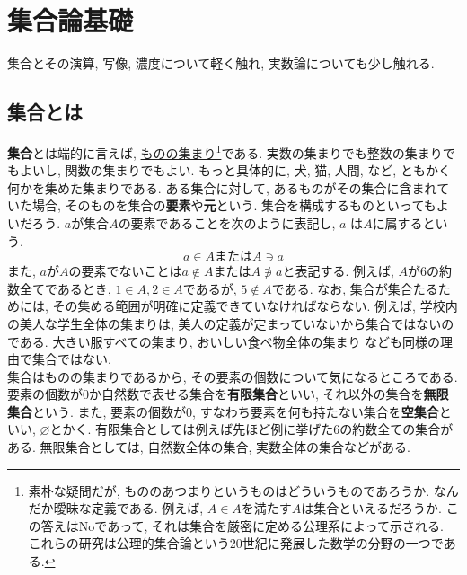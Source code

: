 \section{集合論基礎}
    集合とその演算, 写像, 濃度について軽く触れ, 実数論についても少し触れる.
    \subsection{集合とは}
        \textbf{集合}とは端的に言えば, \underline{ものの集まり}\footnote{素朴な疑問だが, もののあつまりというものはどういうものであろうか. なんだか曖昧な定義である. 例えば, $A\in A$を満たす$A$は集合といえるだろうか.
            この答えはNoであって, それは集合を厳密に定める公理系によって示される. これらの研究は公理的集合論という20世紀に発展した数学の分野の一つである.}である. 実数の集まりでも整数の集まりでもよいし, 関数の集まりでもよい.
        もっと具体的に, 犬, 猫, 人間, など, ともかく何かを集めた集まりである. ある集合に対して, あるものがその集合に含まれていた場合, 
        そのものを集合の\textbf{要素}や\textbf{元}という. 集合を構成するものといってもよいだろう. $a$が集合$A$の要素であることを次のように表記し, $a$
        は$A$に属するという.
        \begin{equation}
            a \in A \text{または} A \ni a \label{eq:集合論基礎:元の表記}
        \end{equation}
        また, $a$が$A$の要素でないことは$a\not\in A$または$A \not\ni a$と表記する. 例えば, $A$が6の約数全てであるとき, 
        $1\in A,2\in A$であるが, $5\not\in A$である. なお, 集合が集合たるためには, その集める範囲が明確に定義できていなければならない.
        例えば, 学校内の美人な学生全体の集まりは, 美人の定義が定まっていないから集合ではないのである. 大きい服すべての集まり, おいしい食べ物全体の集まり
        なども同様の理由で集合ではない. \\
    
        集合はものの集まりであるから, その要素の個数について気になるところである. 要素の個数が0か自然数で表せる集合を\textbf{有限集合}といい, 
        それ以外の集合を\textbf{無限集合}という. また, 要素の個数が0, すなわち要素を何も持たない集合を\textbf{空集合}といい, $\varnothing$とかく.
        有限集合としては例えば先ほど例に挙げた6の約数全ての集合がある. 無限集合としては, 自然数全体の集合, 実数全体の集合などがある.

